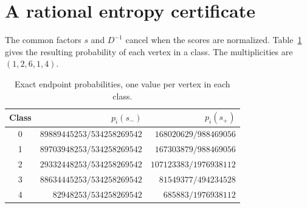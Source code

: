 \documentclass[11pt,a4paper]{article}
\begin{document}
\section{A rational entropy certificate}
The common factors $s$ and $D^{-1}$ cancel when the scores are normalized.
Table~\ref{tab:prob} gives the resulting probability of each vertex in a class.
The multiplicities are $(1,2,6,1,4)$.
\begin{table}[htbp]\centering
\begin{tabular}{@{}crr@{}}\toprule
Class & $p_i(s_-)$ & $p_i(s_+)$\\\midrule
0 & $89889445253/534258269542$ & $168020629/988469056$\\
1 & $89703948253/534258269542$ & $167303879/988469056$\\
2 & $29332448253/534258269542$ & $107123383/1976938112$\\
3 & $88634445253/534258269542$ & $81549377/494234528$\\
4 & $82948253/534258269542$ & $685883/1976938112$\\\bottomrule
\end{tabular}
\caption{Exact endpoint probabilities, one value per vertex in each class.}
\label{tab:prob}\end{table}
\end{document}
